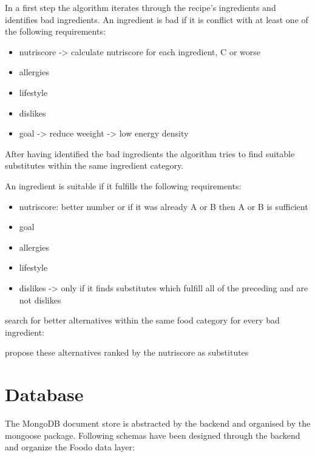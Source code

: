 In a first step the algorithm iterates through the recipe's ingredients and identifies bad ingredients. An ingredient is bad if it is conflict with at least one of the following requirements:
\begin{itemize}
	\item nutriscore -> calculate nutriscore for each ingredient, C or worse
	\item allergies 
	\item lifestyle
	\item dislikes
	\item goal -> reduce weeight -> low energy density
\end{itemize}
                 
After having identified the bad ingredients the algorithm tries to find suitable substitutes within the same ingredient category. 

An ingredient is suitable if it fulfills the following requirements:
\begin{itemize}
\item  nutriscore: better number or if it was already A or B then A or B is sufficient
\item goal
\item allergies
\item lifestyle
\item dislikes -> only if it finds substitutes which fulfill all of the preceding and are not dislikes
\end{itemize}
        

        search for better alternatives within the same food category for every bad ingredient:
       

        propose these alternatives ranked by the nutriscore as substitutes 

\section{Database}
The MongoDB document store is abstracted by the backend and organised by the mongoose package. Following schemas have been designed through the backend and organize the Foodo data layer: 

